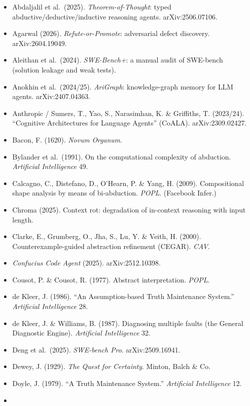 \documentclass[
  10pt,
]{article}
\providecommand{\tightlist}{%
  \setlength{\itemsep}{0pt}\setlength{\parskip}{0pt}}
\begin{document}
\begin{itemize}
\tightlist
\item
  Abdaljalil et al.~(2025). \emph{Theorem-of-Thought}: typed
  abductive/deductive/inductive reasoning agents. arXiv:2506.07106.
\item
  Agarwal (2026). \emph{Refute-or-Promote}: adversarial defect
  discovery. arXiv:2604.19049.
\item
  Aleithan et al.~(2024). \emph{SWE-Bench+}: a manual audit of SWE-bench
  (solution leakage and weak tests).
\item
  Anokhin et al.~(2024/25). \emph{AriGraph}: knowledge-graph memory for
  LLM agents. arXiv:2407.04363.
\item
  Anthropic / Sumers, T., Yao, S., Narasimhan, K. \& Griffiths, T.
  (2023/24). ``Cognitive Architectures for Language Agents'' (CoALA).
  arXiv:2309.02427.
\item
  Bacon, F. (1620). \emph{Novum Organum}.
\item
  Bylander et al.~(1991). On the computational complexity of abduction.
  \emph{Artificial Intelligence} 49.
\item
  Calcagno, C., Distefano, D., O'Hearn, P. \& Yang, H. (2009).
  Compositional shape analysis by means of bi-abduction. \emph{POPL}.
  (Facebook Infer.)
\item
  Chroma (2025). Context rot: degradation of in-context reasoning with
  input length.
\item
  Clarke, E., Grumberg, O., Jha, S., Lu, Y. \& Veith, H. (2000).
  Counterexample-guided abstraction refinement (CEGAR). \emph{CAV}.
\item
  \emph{Confucius Code Agent} (2025). arXiv:2512.10398.
\item
  Cousot, P. \& Cousot, R. (1977). Abstract interpretation. \emph{POPL}.
\item
  de Kleer, J. (1986). ``An Assumption-based Truth Maintenance System.''
  \emph{Artificial Intelligence} 28.
\item
  de Kleer, J. \& Williams, B. (1987). Diagnosing multiple faults (the
  General Diagnostic Engine). \emph{Artificial Intelligence} 32.
\item
  Deng et al.~(2025). \emph{SWE-bench Pro}. arXiv:2509.16941.
\item
  Dewey, J. (1929). \emph{The Quest for Certainty}. Minton, Balch \& Co.
\item
  Doyle, J. (1979). ``A Truth Maintenance System.'' \emph{Artificial
  Intelligence} 12.
\item

\end{itemize}
\end{document}
